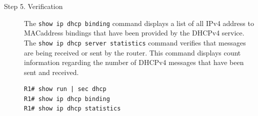 \begin{description}
\item[Step 5. Verification] The \verb|show ip dhcp binding| command displays a list of all IPv4 address to MACaddress bindings that have been provided by the DHCPv4 service. The \verb|show ip dhcp server statistics| command verifies that messages are being
received or sent by the router. This command displays count information regarding the number of DHCPv4 messages that have been sent and received.

\begin{verbatim}
R1# show run | sec dhcp
R1# show ip dhcp binding
R1# show ip dhcp statistics
\end{verbatim}
\end{description}